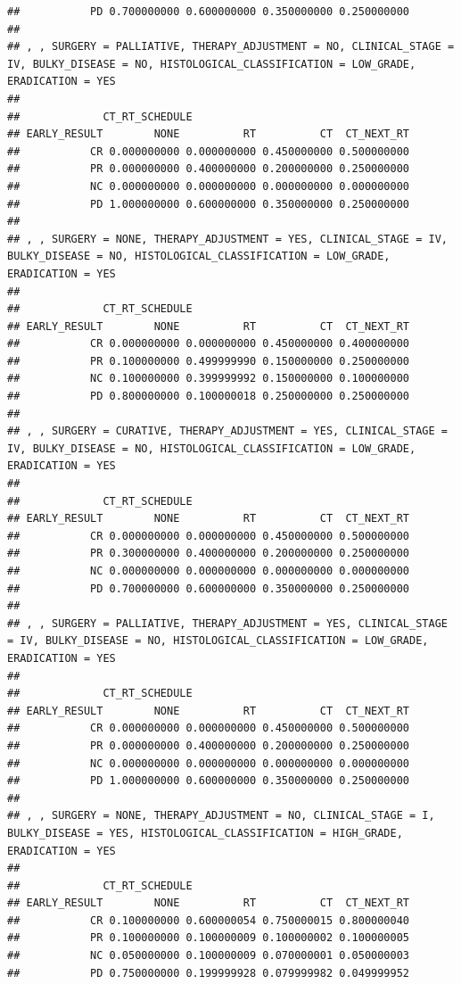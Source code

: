 \documentclass[]{article}
\begin{document}
\begin{verbatim}
##           PD 0.700000000 0.600000000 0.350000000 0.250000000
## 
## , , SURGERY = PALLIATIVE, THERAPY_ADJUSTMENT = NO, CLINICAL_STAGE = IV, BULKY_DISEASE = NO, HISTOLOGICAL_CLASSIFICATION = LOW_GRADE, ERADICATION = YES
## 
##             CT_RT_SCHEDULE
## EARLY_RESULT        NONE          RT          CT  CT_NEXT_RT
##           CR 0.000000000 0.000000000 0.450000000 0.500000000
##           PR 0.000000000 0.400000000 0.200000000 0.250000000
##           NC 0.000000000 0.000000000 0.000000000 0.000000000
##           PD 1.000000000 0.600000000 0.350000000 0.250000000
## 
## , , SURGERY = NONE, THERAPY_ADJUSTMENT = YES, CLINICAL_STAGE = IV, BULKY_DISEASE = NO, HISTOLOGICAL_CLASSIFICATION = LOW_GRADE, ERADICATION = YES
## 
##             CT_RT_SCHEDULE
## EARLY_RESULT        NONE          RT          CT  CT_NEXT_RT
##           CR 0.000000000 0.000000000 0.450000000 0.400000000
##           PR 0.100000000 0.499999990 0.150000000 0.250000000
##           NC 0.100000000 0.399999992 0.150000000 0.100000000
##           PD 0.800000000 0.100000018 0.250000000 0.250000000
## 
## , , SURGERY = CURATIVE, THERAPY_ADJUSTMENT = YES, CLINICAL_STAGE = IV, BULKY_DISEASE = NO, HISTOLOGICAL_CLASSIFICATION = LOW_GRADE, ERADICATION = YES
## 
##             CT_RT_SCHEDULE
## EARLY_RESULT        NONE          RT          CT  CT_NEXT_RT
##           CR 0.000000000 0.000000000 0.450000000 0.500000000
##           PR 0.300000000 0.400000000 0.200000000 0.250000000
##           NC 0.000000000 0.000000000 0.000000000 0.000000000
##           PD 0.700000000 0.600000000 0.350000000 0.250000000
## 
## , , SURGERY = PALLIATIVE, THERAPY_ADJUSTMENT = YES, CLINICAL_STAGE = IV, BULKY_DISEASE = NO, HISTOLOGICAL_CLASSIFICATION = LOW_GRADE, ERADICATION = YES
## 
##             CT_RT_SCHEDULE
## EARLY_RESULT        NONE          RT          CT  CT_NEXT_RT
##           CR 0.000000000 0.000000000 0.450000000 0.500000000
##           PR 0.000000000 0.400000000 0.200000000 0.250000000
##           NC 0.000000000 0.000000000 0.000000000 0.000000000
##           PD 1.000000000 0.600000000 0.350000000 0.250000000
## 
## , , SURGERY = NONE, THERAPY_ADJUSTMENT = NO, CLINICAL_STAGE = I, BULKY_DISEASE = YES, HISTOLOGICAL_CLASSIFICATION = HIGH_GRADE, ERADICATION = YES
## 
##             CT_RT_SCHEDULE
## EARLY_RESULT        NONE          RT          CT  CT_NEXT_RT
##           CR 0.100000000 0.600000054 0.750000015 0.800000040
##           PR 0.100000000 0.100000009 0.100000002 0.100000005
##           NC 0.050000000 0.100000009 0.070000001 0.050000003
##           PD 0.750000000 0.199999928 0.079999982 0.049999952

\end{verbatim}
\end{document}
